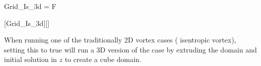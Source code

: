 
\FINALFIX{\newpage}
\begin{nmldescitem}
Grid_Is_3d = F
\end{nmldescitem}
[Grid\_Is\_3d][]

\begin{nmldescbody}
When running one of the traditionally 2D vortex cases (\forexample
isentropic vortex), setting this to true will run a 3D version of the case
by extruding the domain and initial solution in $z$ to create a cube domain.
\end{nmldescbody}


